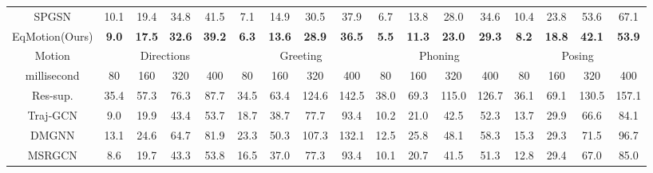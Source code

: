 \documentclass[10pt,twocolumn,letterpaper]{article}
\begin{document}
\begin{table*}[t]
{\begin{tabular}{c|cccc|cccc|cccc|cccc}
SPGSN                &   {10.1}          &   {19.4}          &   {34.8}          &   {41.5}          &   {7.1}           &   {14.9}          &   {30.5}          &   {37.9}          &   {6.7}           &   {13.8}          &   {28.0}          &   {34.6}          &   {10.4}          &   {23.8}          &   {53.6}          &   {67.1}          \\
EqMotion(Ours) & \textbf{9.0}& \textbf{17.5}& \textbf{32.6}& \textbf{39.2}&\textbf{6.3}&\textbf{13.6}&\textbf{28.9}&\textbf{36.5}&\textbf{5.5}&\textbf{11.3}&\textbf{23.0}&\textbf{29.3}&\textbf{8.2}&\textbf{18.8}&\textbf{42.1}&\textbf{53.9}\\\hline
Motion           & \multicolumn{4}{c|}{Directions}                                & \multicolumn{4}{c|}{Greeting}                                  & \multicolumn{4}{c|}{Phoning}                                   & \multicolumn{4}{c}{Posing}                                    \\ \hline
millisecond        & 80           & 160          & 320          & 400          & 80           & 160          & 320          & 400          & 80           & 160          & 320          & 400          & 80           & 160          & 320          & 400          \\ \hline
Res-sup.          & 35.4          & 57.3          & 76.3          & 87.7          & 34.5          & 63.4          & 124.6         & 142.5         & 38.0          & 69.3          & 115.0         & 126.7         & 36.1          & 69.1          & 130.5         & 157.1         \\
Traj-GCN                & 9.0           & 19.9          & 43.4          &  53.7          & 18.7          & 38.7          & 77.7          & 93.4          & 10.2          & 21.0          & 42.5          & 52.3          & 13.7          & 29.9          &  66.6          &  84.1          \\
DMGNN              & 13.1          & 24.6          & 64.7          & 81.9          & 23.3          & 50.3          & 107.3         & 132.1         & 12.5          & 25.8          & 48.1          & 58.3          & 15.3          & 29.3          & 71.5          & 96.7          \\
MSRGCN                &  8.6           &  19.7          &  43.3          & 53.8          &  16.5          &  37.0          &  77.3          &  93.4          &  10.1          &  20.7          &  41.5          &  51.3          &  12.8          &  29.4          & 67.0          & 85.0          \\

\end{tabular}}
\end{table*}
\end{document}
